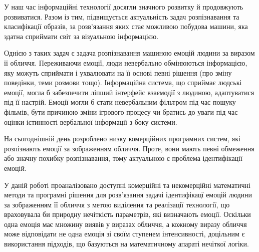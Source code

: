 \intro


У наш час інформаційні технології досягли значного розвитку й
продовжують розвиватися. Разом із тим, підвищується актуальність задач
розпізнавання та класифікації образів, за розв'язання яких стає можливою
побудова машини, яка здатна сприймати світ за візуальною інформацією.

Однією з таких задач є задача розпізнавання машиною емоцій людини за виразом її
обличчя. Переживаючи емоції, люди невербально обмінюються інформацією, яку
можуть сприймати і ухвалювати на її основі певні рішення \cite{ekman} (про
зміну поведінки, теми розмови тощо). Інформаційна система, що сприймає людські
емоції, могла б забезпечити ліпший інтерфейс взаємодії з людиною, адаптуватися
під її настрій. Емоції могли б стати невербальним фільтром під час пошуку
фільмів, бути причиною зміни ігрового процесу чи братись до уваги під час
оцінки істинності вербальної інформації з боку системи.

На сьогоднішній день розроблено низку комерційних програмних систем, які
розпізнають емоції за зображенням обличчя. Проте, вони мають певні обмеження
або значну похибку розпізнавання, тому актуальною є проблема ідентифікації
емоцій.

У даній роботі проаналізовано доступні комерційні та некомерційні математичні
методи та програмні рішення для розв'язання задачі ідентифікацї емоцій людини
за зображенням її обличчя з метою виділення та реалізації технології, що
враховувала би природну нечіткість параметрів, які визначають емоції. Оскільки
одна емоція має множину виявів у виразах обличчя, а кожному виразу обличчя може
відповідати не одна емоція зі своїм ступенем інтенсивності, доцільним є
використання підходів, що базуються на математичному апараті нечіткої логіки.
